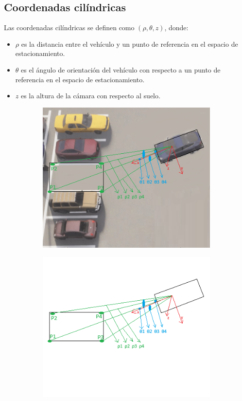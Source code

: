 \subsection{Coordenadas cilíndricas}
\noindent
Las coordenadas cilíndricas se definen como $(\rho, \theta, z)$, donde:
\begin{itemize}
    \item $\rho$ es la distancia entre el vehículo y un punto de referencia en el espacio de estacionamiento.
    \item $\theta$ es el ángulo de orientación del vehículo con respecto a un punto de referencia en el espacio de estacionamiento.
    \item $z$ es la altura de la cámara con respecto al suelo.
\end{itemize}
\begin{figure}[!ht]
    \centering
    \begin{subfigure}{0.4\textwidth}
        \includegraphics[width=\textwidth]{img/distances_ubi_31}\label {fig:distances31}
    \end{subfigure}
    \begin{subfigure}{0.4\textwidth}
        \includegraphics[width=\textwidth]{img/distances_ubi_32}\label {fig:distances32}

\end{subfigure}
\end{figure}
